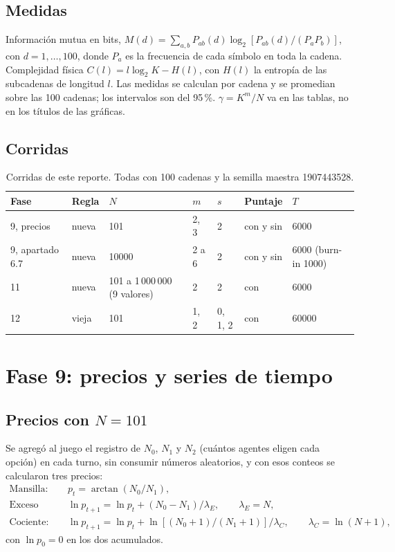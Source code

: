 \documentclass[11pt,letterpaper]{article}
\begin{document}
\subsection{Medidas}
Información mutua en bits, $M(d)=\sum_{a,b}P_{ab}(d)\log_2[P_{ab}(d)/(P_aP_b)]$, con $d=1,\dots,100$, donde $P_a$ es la frecuencia de cada símbolo en toda la cadena. Complejidad física $C(l)=l\log_2 K-H(l)$, con $H(l)$ la entropía de las subcadenas de longitud $l$. Las medidas se calculan por cadena y se promedian sobre las 100 cadenas; los intervalos son del 95\,\%. $\gamma=K^m/N$ va en las tablas, no en los títulos de las gráficas.

\subsection{Corridas}
\begin{table}[H]
\centering\small
\caption{Corridas de este reporte. Todas con 100 cadenas y la semilla maestra 1907443528.}
\begin{tabular}{lllllll}
\toprule
Fase & Regla & $N$ & $m$ & $s$ & Puntaje & $T$\\
\midrule
9, precios & nueva & 101 & 2, 3 & 2 & con y sin & 6000\\
9, apartado 6.7 & nueva & 10000 & 2 a 6 & 2 & con y sin & 6000 (burn-in 1000)\\
11 & nueva & 101 a 1\,000\,000 (9 valores) & 2 & 2 & con & 6000\\
12 & vieja & 101 & 1, 2 & 0, 1, 2 & con & 60000\\
\bottomrule
\end{tabular}
\end{table}

\section{Fase 9: precios y series de tiempo}

\subsection{Precios con $N=101$}
Se agregó al juego el registro de $N_0$, $N_1$ y $N_2$ (cuántos agentes eligen cada opción) en cada turno, sin consumir números aleatorios, y con esos conteos se calcularon tres precios:
\begin{align*}
\text{Mansilla:}&\quad p_t=\arctan(N_0/N_1),\\
\text{Exceso de demanda:}&\quad \ln p_{t+1}=\ln p_t+(N_0-N_1)/\lambda_E,\qquad \lambda_E=N,\\
\text{Cociente:}&\quad \ln p_{t+1}=\ln p_t+\ln[(N_0+1)/(N_1+1)]/\lambda_C,\qquad \lambda_C=\ln(N+1),
\end{align*}
con $\ln p_0=0$ en los dos acumulados.
\end{document}
